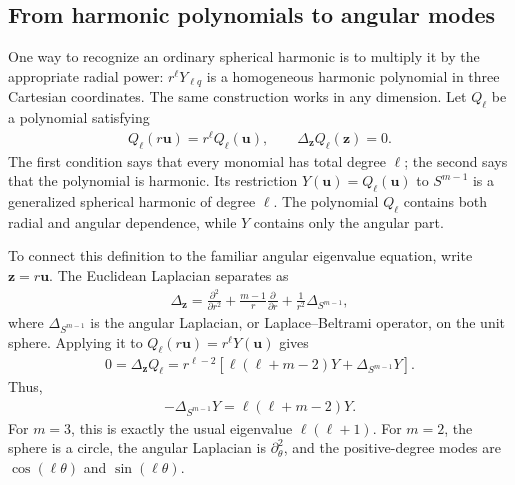 \documentclass[11pt, reqno]{amsart}
\theoremstyle{notestyle}
\theoremstyle{defstyle}
\begin{document}
\subsection{From harmonic polynomials to angular modes}
One way to recognize an ordinary spherical harmonic is to multiply it by the appropriate radial power: $r^\ell Y_{\ell q}$ is a homogeneous harmonic polynomial in three Cartesian coordinates.
The same construction works in any dimension.
Let $Q_\ell$ be a polynomial satisfying
\begin{align*}
    Q_\ell(r\mathbf u)=r^\ell Q_\ell(\mathbf u),
    \qquad \Delta_{\mathbf z}Q_\ell(\mathbf z)=0.
\end{align*}
The first condition says that every monomial has total degree $\ell$; the second says that the polynomial is harmonic.
Its restriction $Y(\mathbf u)=Q_\ell(\mathbf u)$ to $S^{m-1}$ is a generalized spherical harmonic of degree $\ell$.
The polynomial $Q_\ell$ contains both radial and angular dependence, while $Y$ contains only the angular part.

To connect this definition to the familiar angular eigenvalue equation, write $\mathbf z=r\mathbf u$.
The Euclidean Laplacian separates as
\begin{align*}
    \Delta_{\mathbf z}
    =\frac{\partial^2}{\partial r^2}
    +\frac{m-1}{r}\frac{\partial}{\partial r}
    +\frac{1}{r^2}\Delta_{S^{m-1}},
\end{align*}
where $\Delta_{S^{m-1}}$ is the angular Laplacian, or Laplace--Beltrami operator, on the unit sphere.
Applying it to $Q_\ell(r\mathbf u)=r^\ell Y(\mathbf u)$ gives
\begin{align*}
    0=\Delta_{\mathbf z}Q_\ell
    =r^{\ell-2}\left[\ell(\ell+m-2)Y+\Delta_{S^{m-1}}Y\right].
\end{align*}
Thus,
\begin{align}
    -\Delta_{S^{m-1}}Y=\ell(\ell+m-2)Y.
    \label{eq:appendix-harmonic-eigenvalue}
\end{align}
For $m=3$, this is exactly the usual eigenvalue $\ell(\ell+1)$.
For $m=2$, the sphere is a circle, the angular Laplacian is $\partial_\theta^2$, and the positive-degree modes are $\cos(\ell\theta)$ and $\sin(\ell\theta)$.
\end{document}
